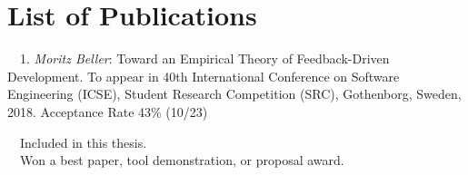 \chapter*{List of Publications}
\label{publications}

\begin{etaremune}{\small
\item[\faFileTextO~~1.] \emph{Moritz Beller}: Toward an Empirical Theory of
  Feedback-Driven Development. To appear in 40th International Conference on
  Software Engineering (ICSE), Student Research Competition (SRC),
  Gothenborg, Sweden, 2018. Acceptance Rate 43\% (10/23)
}\end{etaremune}

\vspace{0.5cm}
\noindent
\faFileTextO~~Included in this thesis.\\
\faTrophy~~Won a best paper, tool demonstration, or proposal award.
